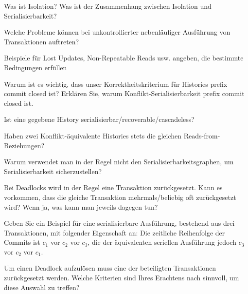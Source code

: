 \begin{fragen}
	\item Was ist Isolation? Was ist der Zusammenhang zwischen Isolation und Serialisierbarkeit?
	\item Welche Probleme können bei unkontrollierter nebenläufiger Ausführung von Transaktionen auftreten?
	\item Beispiele für Lost Updates, Non-Repeatable Reads usw. angeben, die bestimmte Bedingungen erfüllen
	\item Warum ist es wichtig, dass unser Korrektheitskriterium für Histories prefix commit closed ist? Erklären Sie, warum Konflikt-Serialisierbarkeit prefix commit closed ist.
	\item Ist eine gegebene History serialisierbar/recoverable/cascadeless?
	\item Haben zwei Konflikt-äquivalente Histories stets die gleichen Reads-from-Beziehungen?
	\item Warum verwendet man in der Regel nicht den Serialisierbarkeitsgraphen, um Serialisierbarkeit sicherzustellen?
	\item Bei Deadlocks wird in der Regel eine Transaktion zurückgesetzt. Kann es vorkommen, dass die gleiche Transaktion mehrmals/beliebig oft zurückgesetzt wird? Wenn ja, was kann man jeweils dagegen tun?
	\item Geben Sie ein Beispiel für eine serialisierbare Ausführung, bestehend aus drei Transaktionen, mit folgender Eigenschaft an: Die zeitliche Reihenfolge der Commits ist \( c_1 \) vor \( c_2 \) vor \( c_3 \), die der äquivalenten seriellen Ausführung jedoch \( c_3 \) vor \( c_2 \) vor \( c_1 \).
	\item Um einen Deadlock aufzulösen muss eine der beteiligten Transaktionen zurückgesetzt werden. Welche Kriterien sind Ihres Erachtens nach sinnvoll, um diese Auswahl zu treffen?
\end{fragen}